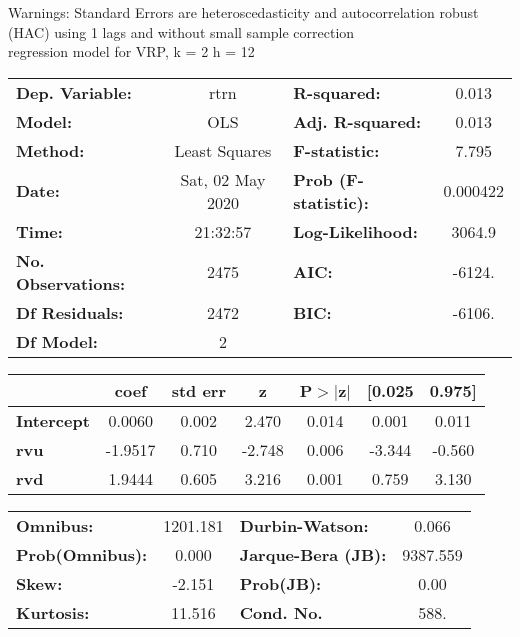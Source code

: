 Warnings: \newline
 [1] Standard Errors are heteroscedasticity and autocorrelation robust (HAC) using 1 lags and without small sample correction\\ 

regression model for VRP, k = 2 h = 12\begin{center}
\begin{tabular}{lclc}
\toprule
\textbf{Dep. Variable:}    &       rtrn       & \textbf{  R-squared:         } &     0.013   \\
\textbf{Model:}            &       OLS        & \textbf{  Adj. R-squared:    } &     0.013   \\
\textbf{Method:}           &  Least Squares   & \textbf{  F-statistic:       } &     7.795   \\
\textbf{Date:}             & Sat, 02 May 2020 & \textbf{  Prob (F-statistic):} &  0.000422   \\
\textbf{Time:}             &     21:32:57     & \textbf{  Log-Likelihood:    } &    3064.9   \\
\textbf{No. Observations:} &        2475      & \textbf{  AIC:               } &    -6124.   \\
\textbf{Df Residuals:}     &        2472      & \textbf{  BIC:               } &    -6106.   \\
\textbf{Df Model:}         &           2      & \textbf{                     } &             \\
\bottomrule
\end{tabular}
\begin{tabular}{lcccccc}
                   & \textbf{coef} & \textbf{std err} & \textbf{z} & \textbf{P$> |$z$|$} & \textbf{[0.025} & \textbf{0.975]}  \\
\midrule
\textbf{Intercept} &       0.0060  &        0.002     &     2.470  &         0.014        &        0.001    &        0.011     \\
\textbf{rvu}       &      -1.9517  &        0.710     &    -2.748  &         0.006        &       -3.344    &       -0.560     \\
\textbf{rvd}       &       1.9444  &        0.605     &     3.216  &         0.001        &        0.759    &        3.130     \\
\bottomrule
\end{tabular}
\begin{tabular}{lclc}
\textbf{Omnibus:}       & 1201.181 & \textbf{  Durbin-Watson:     } &    0.066  \\
\textbf{Prob(Omnibus):} &   0.000  & \textbf{  Jarque-Bera (JB):  } & 9387.559  \\
\textbf{Skew:}          &  -2.151  & \textbf{  Prob(JB):          } &     0.00  \\
\textbf{Kurtosis:}      &  11.516  & \textbf{  Cond. No.          } &     588.  \\
\bottomrule
\end{tabular}
\end{center}

